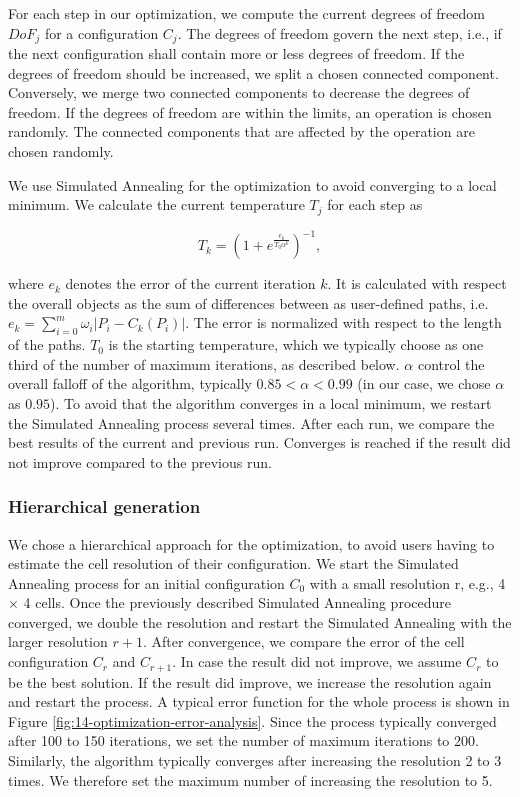 For each step in our optimization, we compute the current degrees of freedom ${DoF}_j$ for a configuration $C_j$. The degrees of freedom govern the next step, i.e., if the next configuration shall contain more or less degrees of freedom. If the degrees of freedom should be increased, we split a chosen connected component. Conversely, we merge two connected components to decrease the degrees of freedom. If the degrees of freedom are within the limits, an operation is chosen randomly. The connected components that are affected by the operation are chosen randomly. 

We use Simulated Annealing for the optimization to avoid converging to a local minimum. We calculate the current temperature $T_j$ for each step as

$$T_k=(1+e^\frac{e_k}{T_0\alpha^k})^{-1},$$

where $e_k$ denotes the error of the current iteration $k$. It is calculated with respect the overall objects as the sum of differences between as user-defined paths, i.e. $e_k=\sum_{i=0}^{m}{\omega_i\left|P_i-C_k\left(P_i\right)\right|.}$ The error is normalized with respect to the length of the paths. $T_0$ is the starting temperature, which we typically choose as one third of the number of maximum iterations, as described below. $\alpha$ control the overall falloff of the algorithm, typically $0.85 < \alpha < 0.99$ (in our case, we chose $\alpha$ as $0.95$). To avoid that the algorithm converges in a local minimum, we restart the Simulated Annealing process several times. After each run, we compare the best results of the current and previous run. Converges is reached if the result did not improve compared to the previous run.


\subsubsection{Hierarchical generation}

We chose a hierarchical approach for the optimization, to avoid users having to estimate the cell resolution of their configuration. We start the Simulated Annealing process for an initial configuration $C_0$ with a small resolution r, e.g., 4 $\times$ 4 cells. Once the previously described Simulated Annealing procedure converged, we double the resolution and restart the Simulated Annealing with the larger resolution $r+1$. After convergence, we compare the error of the cell configuration $C_r$ and $C_{r+1}$. In case the result did not improve, we assume $C_r$ to be the best solution. If the result did improve, we increase the resolution again and restart the process. A typical error function for the whole process is shown in Figure \ref{fig:14-optimization-error-analysis}. Since the process typically converged after 100 to 150 iterations, we set the number of maximum iterations to 200. Similarly, the algorithm typically converges after increasing the resolution 2 to 3 times. We therefore set the maximum number of increasing the resolution to 5.

